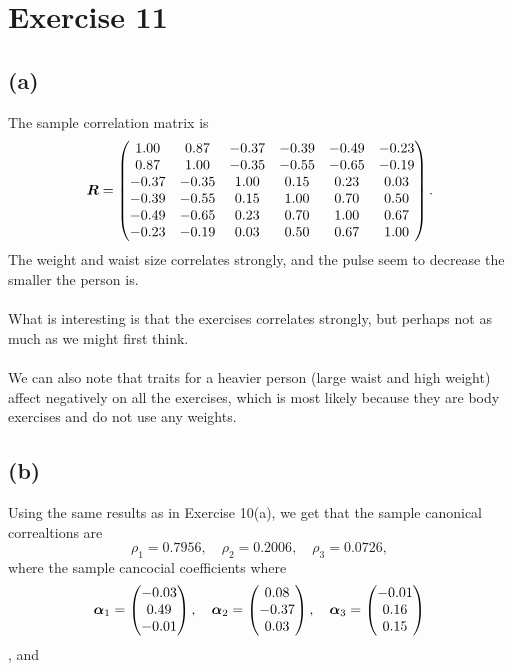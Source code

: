 
\section*{Exercise 11}
\label{sec:exericse-11}

\subsection*{(a)}
\label{sec:a-7}

The sample correlation matrix is
\begin{equation*}
  \bm{R} =
  \begin{pmatrix}
    1.00 &0.87 &-0.37 &-0.39 &-0.49 &-0.23 \\ 
    0.87 &1.00 &-0.35 &-0.55 &-0.65 &-0.19 \\ 
    -0.37 &-0.35 &1.00 &0.15 &0.23 &0.03 \\ 
    -0.39 &-0.55 &0.15 &1.00 &0.70 &0.50 \\ 
    -0.49 &-0.65 &0.23 &0.70 &1.00 &0.67 \\ 
    -0.23 &-0.19 &0.03 &0.50 &0.67 &1.00  
  \end{pmatrix}.
\end{equation*}
The weight and waist size correlates strongly, and the pulse seem to
decrease the smaller the person is. \\
\\
What is interesting is that the exercises correlates strongly, but
perhaps not as much as we might first think. \\
\\
We can also note that traits for a heavier person (large waist and high
weight) affect negatively on all the exercises, which is most likely
because they are body exercises and do not use any weights.

\subsection*{(b)}
\label{sec:b-10}

Using the same results as in Exercise 10(a), we get that the sample
canonical correaltions are
\begin{equation*}
  \rho_{1} =0.7956 , \quad \rho_{2} =  0.2006,\quad  \rho_{3} = 0.0726,
\end{equation*}
where the sample cancocial coefficients where
\begin{equation*}
  \bm{\alpha}_{1} =
  \begin{pmatrix}
    -0.03 \\ 
    0.49 \\ 
    -0.01
  \end{pmatrix}, \quad
  \bm{\alpha}_{2} =
  \begin{pmatrix}
    0.08 \\ 
    -0.37 \\ 
    0.03      
  \end{pmatrix}, \quad
  \bm{\alpha}_{3} =
  \begin{pmatrix}
    -0.01 \\ 
    0.16 \\ 
    0.15
  \end{pmatrix}
\end{equation*},
and

